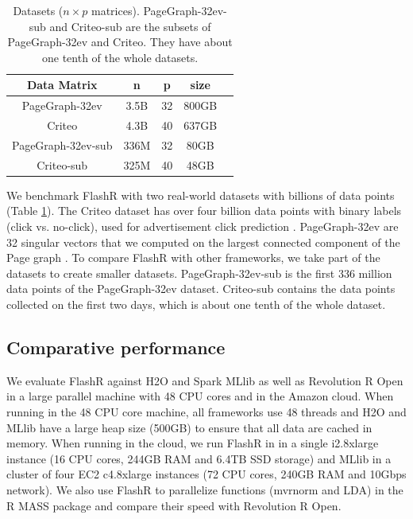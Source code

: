 \begin{table}
\begin{center}
\footnotesize
\begin{tabular}{|c|c|c|c|c|}
\hline
Data Matrix & n & p & size \\
\hline
PageGraph-32ev \cite{webgraph} & 3.5B & 32 & 800GB \\
\hline
Criteo \cite{criteo} & 4.3B & 40 & 637GB \\
\hline
PageGraph-32ev-sub \cite{webgraph} & 336M & 32 & 80GB \\
\hline
Criteo-sub \cite{criteo} & 325M & 40 & 48GB \\
\hline
\end{tabular}
\normalsize
\end{center}
\caption{Datasets ($n \times p$ matrices). PageGraph-32ev-sub and
	Criteo-sub are the subsets of PageGraph-32ev and Criteo. They
	have about one tenth of the whole datasets.}
\label{tbl:data}
\vspace{-5pt}
\end{table}

We benchmark FlashR with two real-world datasets with billions of data points
(Table \ref{tbl:data}). The Criteo dataset has over four billion data points
with binary labels (click vs. no-click), used for advertisement click
prediction \cite{criteo}. PageGraph-32ev are 32 singular vectors that we
computed on the largest connected component of the Page graph \cite{webgraph}.
To compare FlashR with other frameworks, we take part of the datasets to
create smaller datasets. PageGraph-32ev-sub is the first 336 million data points
of the PageGraph-32ev dataset. Criteo-sub contains the data points collected
on the first two days, which is about one tenth of the whole dataset.

\subsection{Comparative performance}
We evaluate FlashR against H2O \cite{h2o} and Spark MLlib \cite{mllib} as well
as Revolution R Open \cite{rro} in a large parallel machine with 48 CPU cores
and in the Amazon cloud. When running in the 48 CPU core machine, all frameworks
use 48 threads and H2O and MLlib have a large heap size (500GB) to ensure that
all data are cached in memory. When running in the cloud, we run FlashR in
in a single i2.8xlarge instance (16 CPU cores, 244GB RAM and 6.4TB SSD storage)
and MLlib in a cluster of four EC2 c4.8xlarge instances (72 CPU cores, 240GB RAM
and 10Gbps network). We also use FlashR to parallelize functions (mvrnorm and LDA)
in the R MASS package and compare their speed with Revolution R Open.

